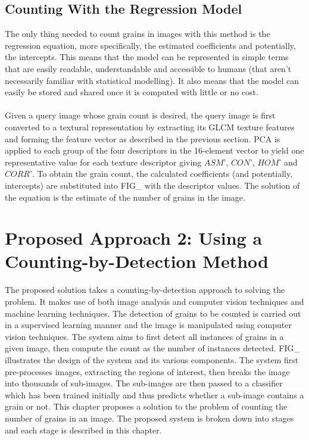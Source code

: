 \goodbreak
\section{Counting With the Regression Model}
The only thing needed to count grains in images with this method is the regression equation, more specifically, the estimated coefficients and potentially, the intercepts. This means that the model can be represented in simple terms that are easily readable, understandable and accessible to humans (that aren't necessarily familiar with statistical modelling). It also means that the model can easily be stored and shared once it is computed with little or no cost.\\ \\
%
Given a query image whose grain count is desired, the query image is first converted to a textural representation by extracting its GLCM texture features and forming the feature vector as described in the previous section. PCA is applied to each group of the four descriptors in the 16-element vector to yield one representative value for each texture descriptor giving $ASM\text{'}$, $CON\text{'}$, $HOM\text{'}$ and $CORR\text{'}$. To obtain the grain count, the calculated coefficients (and potentially, intercepts) are substituted into FIG\_ with the descriptor values. The solution of the equation is the estimate of the number of grains in the image. 
\bigskip



\def\baselinestretch{1}

\chapter{Proposed Approach 2: Using a Counting-by-Detection Method}
\def\baselinestretch{1.66}



The proposed solution takes a counting-by-detection approach to solving the problem. It makes use of both image analysis and computer vision techniques and machine learning techniques. The detection of grains to be counted is carried out in a supervised learning manner and the image is manipulated using computer vision techniques. The system aims to first detect all instances of grains in a given image, then compute the count as the number of instances detected. FIG\_ illustrates the design of the system and its various components. The system first pre-processes images, extracting the regions of interest, then breaks the image into  thousands of sub-images. The sub-images are then passed to a classifier which has been trained initially and thus predicts whether a sub-image contains a grain or not. This chapter proposes a solution to the problem of counting the number of grains in an image. The proposed system is broken down into stages and each stage is described in this chapter.

